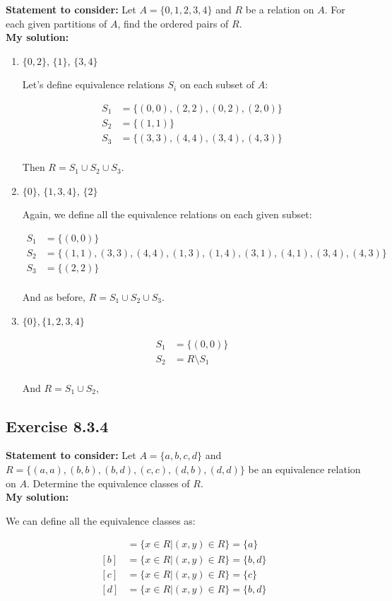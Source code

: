 \documentclass{report}
\newcommand{\mAlign}[1]{\begin{align*}#1\end{align*}}
\newcommand{\In}{\! \in \!}
\newcommand{\assignmentDescription}{\textbf{Statement to consider: }}
\newcommand{\solution}{\textbf{My solution: }}
\newcommand{\Exercise}[1]{\subsection{Exercise #1}}
\newcommand{\defaultEnumerateLabel}{\textbf{\alph*.}}
\begin{document}
	\assignmentDescription
	Let $A=\{0,1,2,3,4\}$ and $R$ be a relation on $A$. For each given partitions of $A$, find the ordered pairs of $R$.\\
	
	\solution
	
	\begin{enumerate}[label=\defaultEnumerateLabel]
		\item $\{0,2\}$, $\{1\}$, $\{3,4\}$
		
		Let's define equivalence relations $S_i$ on each subset of $A$:
		
		\mAlign{S_1&= \{(0,0),(2,2),(0,2),(2,0)\} \\ S_2 &= \{(1,1)\} \\ S_3 &= \{(3,3),(4,4),(3,4),(4,3)\} \\}
		
		Then $R = S_1 \cup S_2 \cup S_3$.
		
		
		\item $\{0\}$, $ \{1,3,4\} $, $ \{2\} $
		
		Again, we define all the equivalence relations on each given subset:
		
		\mAlign{S_1&= \{(0,0)\} \\ S_2 &= \{(1,1),(3,3),(4,4),(1,3),(1,4),(3,1),(4,1),(3,4),(4,3)\} \\ S_3 &= \{(2,2)\} \\}
		
		And as before, $R = S_1 \cup S_2 \cup S_3$.
		
		
		\item $\{0\},\{1,2,3,4\}$
		
		\mAlign{S_1&= \{(0,0)\} \\ S_2 &= R \setminus S_1 \\}
		
		And $R = S_1 \cup S_2$,
	\end{enumerate}
	
	\Exercise{8.3.4}
	
	\assignmentDescription
	Let $A=\{a,b,c,d\}$ and $R=\{(a,a),(b,b), (b,d),(c,c),(d,b),(d,d)\}$ be an equivalence relation on $A$. Determine the equivalence classes of $R$.\\
	
	\solution
	
	We can define all the equivalence classes as:
	
	\mAlign{[a] &= \{x \in R | (x,y) \In R\} = \{a\} \\
					[b] &= \{x \in R | (x,y) \In R\} = \{b,d\} \\
					[c] &= \{x \in R | (x,y) \In R\} = \{c\} \\
					[d] &= \{x \in R | (x,y) \In R\} = \{b,d\}}
	
\end{document}
